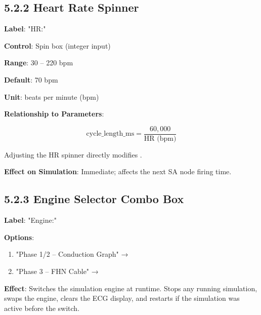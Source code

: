 \subsection{5.2.2 Heart Rate Spinner}

\textbf{Label}: "HR:"

\textbf{Control}: Spin box (integer input)

\textbf{Range}: 30 -- 220 bpm

\textbf{Default}: 70 bpm

\textbf{Unit}: beats per minute (bpm)

\textbf{Relationship to Parameters}:

$$\text{cycle\_length\_ms} = \frac{60,000}{\text{HR (bpm)}}$$

Adjusting the HR spinner directly modifies .

\textbf{Effect on Simulation}: Immediate; affects the next SA node firing time.

\subsection{5.2.3 Engine Selector Combo Box}

\textbf{Label}: "Engine:"

\textbf{Options}:
\begin{enumerate}
  \item "Phase 1/2 – Conduction Graph" → 
  \item "Phase 3 – FHN Cable" → 
\end{enumerate}

\textbf{Effect}: Switches the simulation engine at runtime. Stops any running simulation, swaps the engine, clears the ECG display, and restarts if the simulation was active before the switch.

